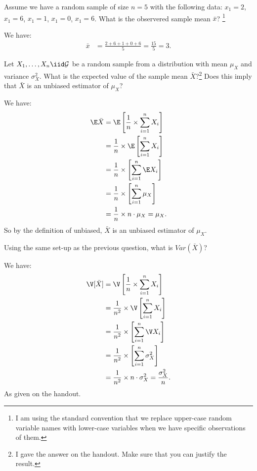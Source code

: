 
Assume we have a random sample of size $n = 5$ with the following data:
$x_1 = 2$, $x_1 = 6$, $x_1 = 1$, $x_1 = 0$, $x_1 = 6$. What is the observered
sample mean $\bar{x}$? 
\footnote{
  I am using the standard convention that we replace upper-case random 
  variable names with lower-case variables when we have specific 
  observations of them. 
}


We have:
\begin{align*}
\bar{x} &= \frac{2 + 6 + 1 + 0 + 6}{5} = \frac{15}{5} = 3.
\end{align*}


Let $X_1, \ldots, X_n \iid \mathcal{G}$ be a random sample from a distribution
with mean $\mu_X$ and variance $\sigma^2_X$. What is the expected value of the
sample mean $\bar{X}$?\footnote{
  I gave the answer on the handout. Make sure that you can justify
  the result.
} Does this imply that $\bar{X}$ is an unbiased estimator of $\mu_X$?


We have:
\begin{align*}
\E \bar{X} &= \E \left[ \frac{1}{n} \times \sum_{i=1}^n X_i \right] \\
&= \frac{1}{n} \times \E \left[ \sum_{i=1}^n X_i \right] \\
&= \frac{1}{n} \times \left[ \sum_{i=1}^n \E X_i \right] \\
&= \frac{1}{n} \times \left[ \sum_{i=1}^n \mu_X \right] \\
&= \frac{1}{n} \times n \cdot \mu_X = \mu_X.
\end{align*}
So by the definition of unbiased, $\bar{X}$ is an unbiased estimator of $\mu_X$.



Using the same set-up as the previous question, what is $Var(\bar{X})$?


We have:
\begin{align*}
\V [\bar{X}] &= \V \left[ \frac{1}{n} \times \sum_{i=1}^n X_i \right] \\
&= \frac{1}{n^2} \times \V \left[ \sum_{i=1}^n X_i \right] \\
&= \frac{1}{n^2} \times \left[ \sum_{i=1}^n \V X_i \right] \\
&= \frac{1}{n^2} \times \left[ \sum_{i=1}^n \sigma_X^2 \right] \\
&= \frac{1}{n^2} \times n \cdot \sigma_X^2 = \frac{\sigma_X^2}{n}.
\end{align*}
As given on the handout.

